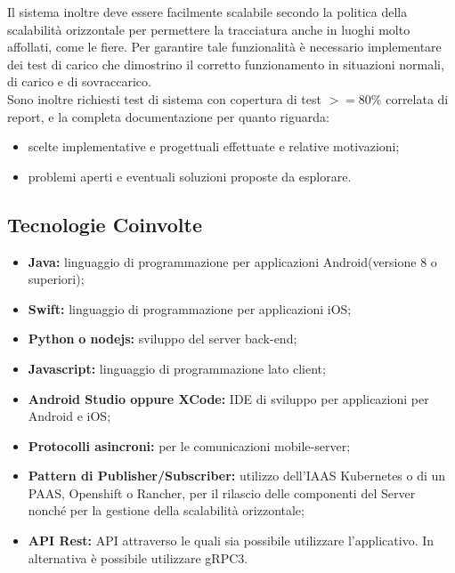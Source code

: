 	Il sistema inoltre deve essere facilmente scalabile secondo la politica della scalabilità orizzontale per permettere la tracciatura anche in luoghi molto affollati, come le fiere. Per garantire tale funzionalità è necessario implementare dei test di carico che dimostrino il corretto funzionamento in situazioni normali, di carico e di sovraccarico.\\
	Sono inoltre richiesti test di sistema con copertura di test $>=80\%$ correlata di report, e la completa documentazione per quanto riguarda:
	\begin{itemize}
		\item scelte implementative e progettuali effettuate e relative motivazioni;
		\item problemi aperti e eventuali soluzioni proposte da esplorare. 
	\end{itemize}
	\subsection{Tecnologie Coinvolte}
	\begin{itemize}
		\item \textbf{Java}\textbf{:} linguaggio di programmazione per applicazioni Android(versione 8 o superiori);
		\item \textbf{Swift}\textbf{:} linguaggio di programmazione per applicazioni iOS;
		\item \textbf{Python} \textbf{o nodejs}\textbf{:} sviluppo del server back-end;
		\item \textbf{Javascript}\textbf{:} linguaggio di programmazione lato client;
		\item \textbf{Android Studio oppure XCode:} IDE di sviluppo per applicazioni per Android e iOS;
		\item \textbf{Protocolli asincroni:} per le comunicazioni mobile-server;
		\item \textbf{Pattern di Publisher/Subscriber:} utilizzo dell’IAAS Kubernetes o di un PAAS, Openshift o Rancher, per il rilascio delle componenti del Server nonché per la gestione della scalabilità orizzontale;
		\item \textbf{API Rest}\textbf{:} API attraverso le quali sia possibile utilizzare l'applicativo. In alternativa è possibile utilizzare gRPC3.
	\end{itemize}
	
